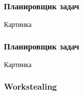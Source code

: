 \documentclass[hyperref={unicode}]{beamer}
\begin{document}
\begin{frame}
    \frametitle{Планировщик задач}


    Картинка


\end{frame}

\begin{frame}
    \frametitle{Планировщик задач}

	Картинка

\end{frame}

\begin{frame}
	\frametitle{Workstealing}
\end{frame}


\begin{frame}
    \frametitle{}
\end{frame}
\end{document}
